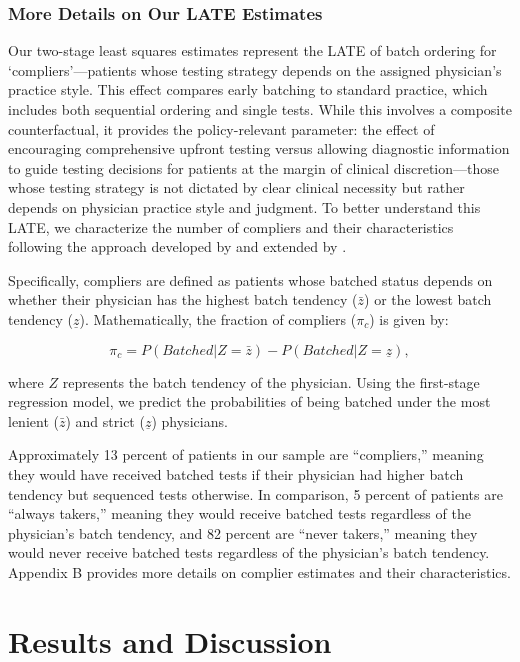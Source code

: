 \documentclass[,,nonblindrev]{informs}
\begin{document}
\subsubsection{More Details on Our LATE
Estimates}\label{more-details-on-our-late-estimates}

Our two-stage least squares estimates represent the LATE of batch
ordering for `compliers'---patients whose testing strategy depends on
the assigned physician's practice style. This effect compares early
batching to standard practice, which includes both sequential ordering
and single tests. While this involves a composite counterfactual, it
provides the policy-relevant parameter: the effect of encouraging
comprehensive upfront testing versus allowing diagnostic information to
guide testing decisions for patients at the margin of clinical
discretion---those whose testing strategy is not dictated by clear
clinical necessity but rather depends on physician practice style and
judgment. To better understand this LATE, we characterize the number of
compliers and their characteristics following the approach developed by
\citet{abadie2003economic} and extended by \citet{dahl2014peer}.

Specifically, compliers are defined as patients whose batched status
depends on whether their physician has the highest batch tendency
(\(\bar{z}\)) or the lowest batch tendency (\(\underline{z}\)).
Mathematically, the fraction of compliers (\(\pi_c\)) is given by:

\[
\pi_c = P(Batched | Z = \bar{z}) - P(Batched | Z = \underline{z}),
\]

where \(Z\) represents the batch tendency of the physician. Using the
first-stage regression model, we predict the probabilities of being
batched under the most lenient (\(\bar{z}\)) and strict
(\(\underline{z}\)) physicians.

Approximately 13 percent of patients in our sample are ``compliers,''
meaning they would have received batched tests if their physician had
higher batch tendency but sequenced tests otherwise. In comparison, 5
percent of patients are ``always takers,'' meaning they would receive
batched tests regardless of the physician's batch tendency, and 82
percent are ``never takers,'' meaning they would never receive batched
tests regardless of the physician's batch tendency. Appendix B provides
more details on complier estimates and their characteristics.

\section{Results and Discussion}\label{results-and-discussion}
\end{document}
